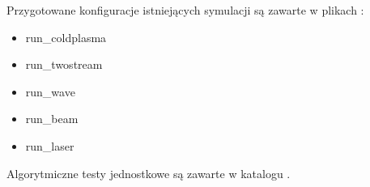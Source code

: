 Przygotowane konfiguracje istniejących symulacji są zawarte w plikach
: 
\begin{itemize}
    \item run\_coldplasma
    \item run\_twostream
    \item run\_wave
    \item run\_beam
    \item run\_laser
\end{itemize}

Algorytmiczne testy jednostkowe są zawarte w katalogu .
